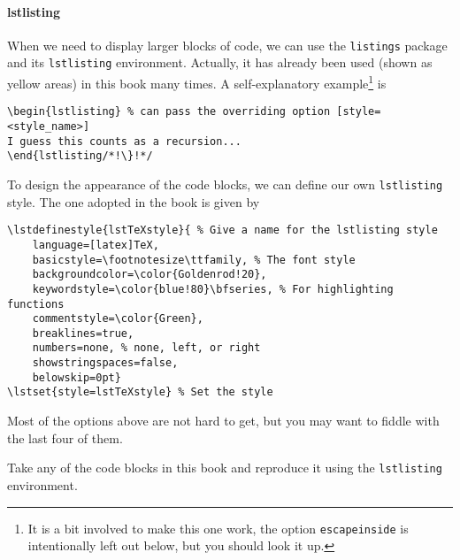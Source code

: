 \paragraph{lstlisting}
When we need to display larger blocks of code, we can use the \verb|listings| package and its \verb|lstlisting| environment. Actually, it has already been used (shown as yellow areas) in this book many times. A self-explanatory example\footnote{It is a bit involved to make this one work, the option \texttt{escapeinside} is intentionally left out below, but you should look it up.} is
\begin{lstlisting}
\begin{lstlisting} % can pass the overriding option [style=<style_name>]
I guess this counts as a recursion...
\end{lstlisting/*!\}!*/
\end{lstlisting}
To design the appearance of the code blocks, we can define our own \verb|lstlisting| style. The one adopted in the book is given by
\begin{lstlisting}
\lstdefinestyle{lstTeXstyle}{ % Give a name for the lstlisting style
    language=[latex]TeX, 
    basicstyle=\footnotesize\ttfamily, % The font style
    backgroundcolor=\color{Goldenrod!20},
    keywordstyle=\color{blue!80}\bfseries, % For highlighting functions
    commentstyle=\color{Green},
    breaklines=true, 
    numbers=none, % none, left, or right
    showstringspaces=false,
    belowskip=0pt}
\lstset{style=lstTeXstyle} % Set the style
\end{lstlisting}
Most of the options above are not hard to get, but you may want to fiddle with the last four of them.

\begin{exercisebox}
\begin{Exercise}
Take any of the code blocks in this book and reproduce it using the \verb|lstlisting|  environment.
\end{Exercise}
\end{exercisebox}